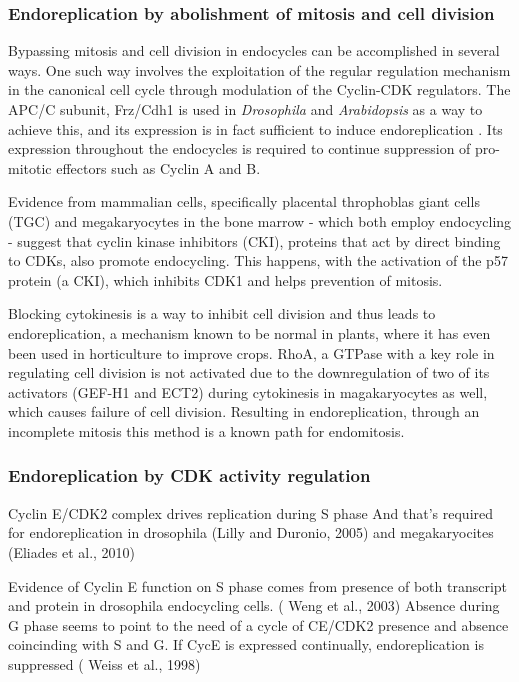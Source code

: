 \documentclass[11pt,twoside,a4paper]{report}
\begin{document}
				\subsubsection{Endoreplication by abolishment of mitosis and cell division}
				Bypassing mitosis and cell division in endocycles can be accomplished in several ways. One such way involves the exploitation of the regular regulation mechanism in the canonical cell cycle through modulation of the Cyclin-CDK regulators. 
				The APC/C subunit, Frz/Cdh1 is used in \textit{Drosophila} and \textit{Arabidopsis} as a way to achieve this, and its expression is in fact sufficient to induce endoreplication \cite{asd}. Its expression throughout the endocycles is required to continue suppression of pro-mitotic effectors such as Cyclin A and B.
				
				Evidence from mammalian cells, specifically placental throphoblas giant cells (TGC) and megakaryocytes in the bone marrow - which both employ endocycling - suggest that cyclin kinase inhibitors (CKI), proteins that act by direct binding to CDKs, also promote endocycling. This happens, with the activation of the p57 protein (a CKI), which inhibits CDK1 and helps prevention of mitosis.	 

			 	Blocking cytokinesis is a way to inhibit cell division and thus leads to endoreplication, a mechanism known to be normal in plants, where it has even been used in horticulture to improve crops. RhoA, a GTPase with a key role in regulating cell division is not activated due to the downregulation of two of its activators (GEF-H1 and ECT2) during cytokinesis in magakaryocytes as well, which causes failure of cell division. Resulting in endoreplication, through an incomplete mitosis this method is a known path for endomitosis.
			 
			\subsubsection{Endoreplication by CDK activity regulation}
			Cyclin E/CDK2 complex drives replication during S phase
			And that's required for endoreplication in drosophila (Lilly and Duronio, 2005) and megakaryocites (Eliades et al., 2010)

			Evidence of Cyclin E function on S phase comes from presence of both transcript and protein in drosophila endocycling cells. ( Weng et al., 2003)
			Absence during G phase seems to point to the need of a cycle of CE/CDK2 presence and absence coincinding with S and G. 
			If CycE is expressed continually, endoreplication is suppressed ( Weiss et al., 1998)
\end{document}
